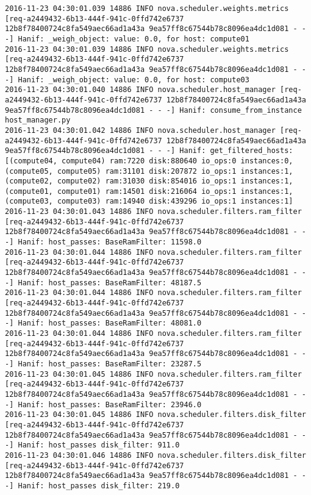 \begin{lstlisting}[frame=single, caption={The filter scheduler log trace for 10 virtual instances}, label={lst:filterschedulercodetracelog10vi}, escapechar=|]
2016-11-23 04:30:01.039 14886 INFO nova.scheduler.weights.metrics [req-a2449432-6b13-444f-941c-0ffd742e6737 12b8f78400724c8fa549aec66ad1a43a 9ea57ff8c67544b78c8096ea4dc1d081 - - -] Hanif: _weigh_object: value: 0.0, for host: compute01
2016-11-23 04:30:01.039 14886 INFO nova.scheduler.weights.metrics [req-a2449432-6b13-444f-941c-0ffd742e6737 12b8f78400724c8fa549aec66ad1a43a 9ea57ff8c67544b78c8096ea4dc1d081 - - -] Hanif: _weigh_object: value: 0.0, for host: compute03
2016-11-23 04:30:01.040 14886 INFO nova.scheduler.host_manager [req-a2449432-6b13-444f-941c-0ffd742e6737 12b8f78400724c8fa549aec66ad1a43a 9ea57ff8c67544b78c8096ea4dc1d081 - - -] Hanif: consume_from_instance host_manager.py
2016-11-23 04:30:01.042 14886 INFO nova.scheduler.host_manager [req-a2449432-6b13-444f-941c-0ffd742e6737 12b8f78400724c8fa549aec66ad1a43a 9ea57ff8c67544b78c8096ea4dc1d081 - - -] Hanif: get_filtered_hosts: [(compute04, compute04) ram:7220 disk:880640 io_ops:0 instances:0, (compute05, compute05) ram:31101 disk:207872 io_ops:1 instances:1, (compute02, compute02) ram:31030 disk:854016 io_ops:1 instances:1, (compute01, compute01) ram:14501 disk:216064 io_ops:1 instances:1, (compute03, compute03) ram:14940 disk:439296 io_ops:1 instances:1]
2016-11-23 04:30:01.043 14886 INFO nova.scheduler.filters.ram_filter [req-a2449432-6b13-444f-941c-0ffd742e6737 12b8f78400724c8fa549aec66ad1a43a 9ea57ff8c67544b78c8096ea4dc1d081 - - -] Hanif: host_passes: BaseRamFilter: 11598.0
2016-11-23 04:30:01.044 14886 INFO nova.scheduler.filters.ram_filter [req-a2449432-6b13-444f-941c-0ffd742e6737 12b8f78400724c8fa549aec66ad1a43a 9ea57ff8c67544b78c8096ea4dc1d081 - - -] Hanif: host_passes: BaseRamFilter: 48187.5
2016-11-23 04:30:01.044 14886 INFO nova.scheduler.filters.ram_filter [req-a2449432-6b13-444f-941c-0ffd742e6737 12b8f78400724c8fa549aec66ad1a43a 9ea57ff8c67544b78c8096ea4dc1d081 - - -] Hanif: host_passes: BaseRamFilter: 48081.0
2016-11-23 04:30:01.044 14886 INFO nova.scheduler.filters.ram_filter [req-a2449432-6b13-444f-941c-0ffd742e6737 12b8f78400724c8fa549aec66ad1a43a 9ea57ff8c67544b78c8096ea4dc1d081 - - -] Hanif: host_passes: BaseRamFilter: 23287.5
2016-11-23 04:30:01.045 14886 INFO nova.scheduler.filters.ram_filter [req-a2449432-6b13-444f-941c-0ffd742e6737 12b8f78400724c8fa549aec66ad1a43a 9ea57ff8c67544b78c8096ea4dc1d081 - - -] Hanif: host_passes: BaseRamFilter: 23946.0
2016-11-23 04:30:01.045 14886 INFO nova.scheduler.filters.disk_filter [req-a2449432-6b13-444f-941c-0ffd742e6737 12b8f78400724c8fa549aec66ad1a43a 9ea57ff8c67544b78c8096ea4dc1d081 - - -] Hanif: host_passes disk_filter: 911.0
2016-11-23 04:30:01.046 14886 INFO nova.scheduler.filters.disk_filter [req-a2449432-6b13-444f-941c-0ffd742e6737 12b8f78400724c8fa549aec66ad1a43a 9ea57ff8c67544b78c8096ea4dc1d081 - - -] Hanif: host_passes disk_filter: 219.0

\end{lstlisting}

